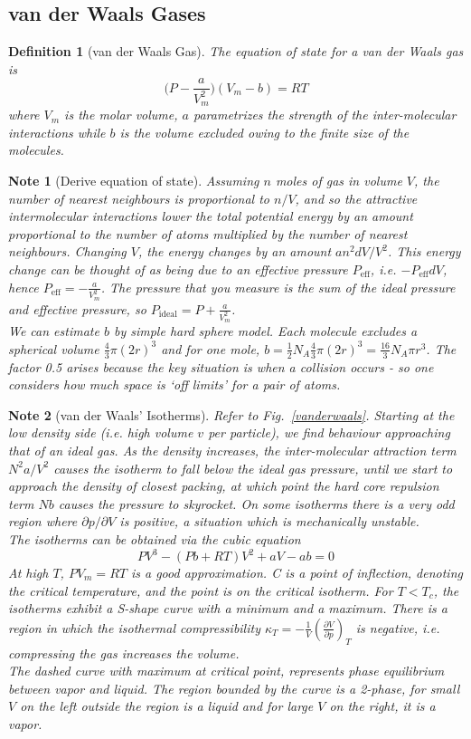 \documentclass[a4paper]{article}
\newtheorem{Note}{Note}[section]
\theoremstyle{new}
\newtheorem{defi}{Definition}[section]
\begin{document}
\subsection{van der Waals Gases}
\begin{defi}[van der Waals Gas]
The equation of state for a van der Waals gas is
\begin{equation}
\bigg(P-\frac{a}{V_m^2}\bigg)(V_m-b)=RT\label{vdW}
\end{equation}
where $V_m$ is the molar volume, $a$ parametrizes the strength of the inter-molecular interactions while $b$ is the volume excluded owing to the finite size of the molecules.
\end{defi}
\begin{Note}[Derive equation of state]
Assuming $n$ moles of gas in volume $V$, the number of nearest neighbours is proportional to $n/V$, and so the attractive intermolecular interactions lower the total potential energy by an amount proportional to the number of atoms multiplied by the number of nearest neighbours. Changing $V$, the energy changes by an amount $an^2dV/V^2$. This energy change can be thought of as being due to an effective pressure $P_{\text{eff}}$, i.e. $-P_{\text{eff}}dV$, hence $P_{\text{eff}}=-\frac{a}{V_m^2}$. The pressure that you measure is the sum of the ideal pressure and effective pressure, so $P_{\text{ideal}}=P+\frac{a}{V_m^2}$.\\[5pt]
We can estimate $b$ by simple hard sphere model. Each molecule excludes a spherical volume $\frac{4}{3}\pi(2r)^3$ and for one mole, $b=\frac{1}{2}N_A\frac{4}{3}\pi(2r)^3=\frac{16}{3}N_A\pi r^3$. The factor 0.5 arises because the key situation is when a collision occurs - so one considers how much space is `off limits' for a pair of atoms.
\end{Note}
\begin{Note}[van der Waals' Isotherms]
Refer to Fig.~\ref{vanderwaals}. Starting at the low density side (i.e. high volume $v$ per particle), we find behaviour approaching that of an ideal gas. As the density increases, the inter-molecular attraction term $N^2a/V^2$ causes the isotherm to fall below the ideal gas pressure, until we start to approach the density of closest packing, at which point the hard core repulsion term $N b$ causes the pressure to skyrocket. On some isotherms there is a very odd region where $\partial p/\partial V$ is positive, a situation which is mechanically unstable.\\[5pt]
The isotherms can be obtained via the cubic equation
$$PV^3-(Pb+RT)V^2+aV-ab=0$$
At high $T$, $PV_m=RT$ is a good approximation. C is a point of inflection, denoting the critical temperature, and the point is on the critical isotherm. For $T<T_c$, the isotherms exhibit a S-shape curve with a minimum and a maximum. There is a region in which the isothermal compressibility $\kappa_T=-\frac{1}{V}(\frac{\partial V}{\partial p})_T$ is negative, i.e. compressing the gas increases the volume.\\[5pt]
The dashed curve with maximum at critical point, represents phase equilibrium between vapor and liquid. The region bounded by the curve is a 2-phase, for small $V$ on the left outside the region is a liquid and for large $V$ on the right, it is a vapor.
\end{Note}
\end{document}
